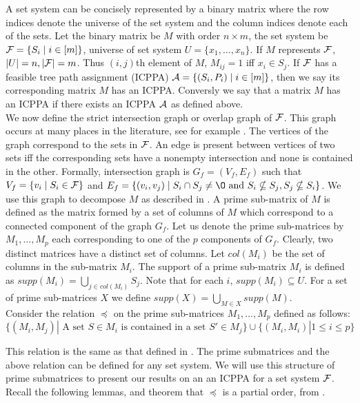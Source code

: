 \documentclass{llncs}
\def\cA{{\cal A}}
\def\cF{{\cal F}}
\begin{document}
\noindent
A set system can be concisely represented by a binary matrix where the
row indices denote the universe of the set system and the column
indices denote each of the sets. Let the binary matrix be $M$ with
order $n \times m$, the set system be $\cF = \{S_i \mid i \in [m]\}$,
universe of set system $U = \{x_1, \dots ,x_n\}$. If $M$ represents $\cF$, $|U| = n, |\cF| =
m$. Thus $(i,j)$th element of $M$, $M_{ij} = 1$ iff $x_i \in S_j$. If $\cF$ has a feasible tree path assignment (ICPPA) $\cA =
\{(S_i,P_i) \mid i \in [m]\}$, then we
say its corresponding matrix $M$ has an ICPPA. Conversly
we say that a matrix $M$ has an ICPPA if there exists an ICPPA $\cA$ as defined
above.\\
\noindent
We now define the strict intersection graph or overlap graph of $\cF$. This graph occurs at many
places in the literature, see for example \cite{kklv10, wlh02, nsnrs09}.  The vertices of the graph
correspond to the sets in $\cF$.  An edge is present between vertices of two sets iff the
corresponding sets have a nonempty intersection and none is contained
in the other. Formally, intersection graph is $G_f = (V_f, E_f)$ such
that $V_f = \{v_i \mid S_i \in \cF\}$ and $E_f = \{(v_i, v_j) \mid S_i
\cap S_j \ne \O \text{ and }S_i \nsubseteq S_j, S_j \nsubseteq S_i
\}$.  We use this graph to decompose $M$ as described in \cite{wlh02,nsnrs09}.  
A prime sub-matrix of $M$ is defined as the
matrix formed by a set of columns of $M$ which correspond to a
connected component of the graph $G_f$.  Let us denote the prime
sub-matrices by $M_1,\ldots,M_p$ each corresponding to one of the $p$
components of $G_f$. Clearly, two distinct matrices have
a distinct set of columns.  Let $col(M_i)$ be the set of columns in
the sub-matrix $M_i$.  The support
of a prime sub-matrix $M_i$ is defined as $supp(M_i) = \displaystyle \bigcup_{j \in  col(M_i)}S_j$. 
Note that for each $i$, $supp(M_i) \subseteq
U$.  For a set of prime sub-matrices $X$ we define
$supp(X) = \displaystyle \bigcup_{M \in X} supp(M)$. \\


\noindent
Consider the relation
$\preccurlyeq$ on the prime sub-matrices $M_1, \ldots, M_p$ defined as
follows: 
\begin{equation} 
\nonumber \{(M_i,M_j) | \mbox{ A set } S \in
  M_i \mbox{ is contained in a set } S' \in M_j\} \cup \{(M_i,M_i) | 1
  \leq i \leq p\} 
\end{equation}

\noindent
This relation is the same as that defined in \cite{nsnrs09}. The prime
submatrices and the above relation can be defined for any set
system. We will use this structure of prime submatrices to present our
results on an an ICPPA for a set system $\cF$. Recall the following
lemmas, and theorem that $\preccurlyeq$ is a partial order, from
\cite{nsnrs09}.
\end{document}
